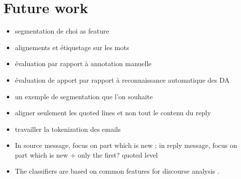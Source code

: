 

\section{Future work}
\label{sec:futureWork}

\begin{itemize}
\item segmentation de choi as feature
\item alignements et étiquetage sur les mots
\item évaluation par rapport à annotation manuelle
\item évaluation de apport par rapport à reconnaissance automatique des DA 
\item un exemple de segmentation que l'on souhaite
\item aligner seulement les quoted lines et non tout le contenu du reply
\item travailler la tokenization des emails
\item In source message, focus on part which is new ; in reply message, focus on part which is new + only the first? quoted level 
\item The classifiers are based on common features for discourse analysis \cite{joty:2013:acl}.
 
\end{itemize}
